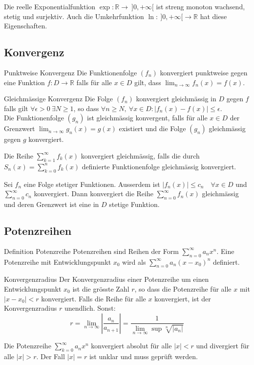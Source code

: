 \documentclass[a4paper,10pt]{article}
\def\limn{\lim_{n\to \infty}}
\def\sumk{\sum_{k=1}^\infty}
\def\R{\mathbb{R}}
\begin{document}
\begin{subbox}{Die reelle Exponentialfunktion}
 $\exp: \R \to \ ]0,+\infty[$ ist streng monoton wachsend, stetig und surjektiv. Auch die Umkehrfunktion $\ln: \ ]0,+\infty[ \to \R$ hat diese Eigenschaften.
\end{subbox}

\subsection{Konvergenz}

\begin{mainbox}{Punktweise Konvergenz}
  Die Funktionenfolge $(f_n)$ konvergiert punktweise gegen eine Funktion $f: D \to \R$ falls für alle $x \in D$ gilt, dass $\limn f_n(x) = f(x)$.
\end{mainbox}

\begin{mainbox}{Gleichmässige Konvergenz}
 Die Folge $(f_n)$ konvergiert gleichmässig in $D$ gegen $f$ falls gilt $\forall \epsilon > 0 \ \exists N \ge 1$, so dass $\forall n \ge N, \ \forall x \in D: | f_n(x) - f(x) | \le \epsilon$. \\
 Die Funktionenfolge $(g_n)$ ist gleichmässig konvergent, falls für alle $x\in D$ der Grenzwert $\limn g_n(x) = g(x)$ existiert und die Folge $(g_n)$ gleichmässig gegen $g$ konvergiert.
\end{mainbox}
Die Reihe $\sumk f_k(x)$ konvergiert gleichmässig, falls die durch $S_n(x) = \sum_{k=0}^n f_k(x)$ definierte Funktionenfolge gleichmässig konvergiert.

\begin{subbox}{}
 Sei $f_n$ eine Folge stetiger Funktionen. Ausserdem ist $|f_n(x)| \le c_n \quad \forall x \in D$ und $\sum_{n=0}^\infty c_n$ konvergiert. Dann konvergiert die Reihe $\sum_{n=0}^\infty f_n(x)$ gleichmässig und deren Grenzwert ist eine in $D$ stetige Funktion.
\end{subbox}

\subsection{Potenzreihen}
\begin{subbox}{Definition Potenzreihe}
 Potenzreihen sind Reihen der Form $\sum_{n=0}^\infty a_n x^n$. Eine Potenzreihe mit Entwicklungspunkt $x_0$ wird als $\sum_{n=0}^\infty a_n(x-x_0)^n$ definiert.
\end{subbox}

\begin{mainbox}{Konvergenzradius}
 Der Konvergenzradius einer Potenzreihe um einen Entwicklungspunkt $x_0$ ist die grösste Zahl $r$, so dass die Potenzreihe für alle $x$ mit $|x - x_0| < r$ konvergiert. Falls die Reihe für alle $x$ konvergiert, ist der Konvergenzradius $r$ unendlich. Sonst:
 $$r = \limn \left| \frac{a_n}{a_{n+1}} \right| = \frac{1}{\limn\sup \sqrt[n]{|a_n|}} $$
\end{mainbox}
Die Potenzreihe $\sum_{k=0}^\infty a_n x^n$ konvergiert absolut für alle $|x| < r$ und divergiert für alle $|x| > r$. Der Fall $|x| = r$ ist unklar und muss geprüft werden.
\end{document}
